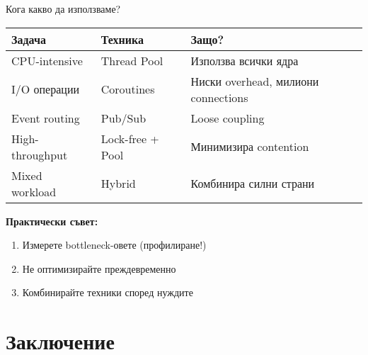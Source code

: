 \documentclass[aspectratio=169]{beamer}
\begin{document}
\begin{frame}{Кога какво да използваме?}
\begin{table}
\centering
\small
\begin{tabular}{|l|l|l|}
\hline
\textbf{Задача} & \textbf{Техника} & \textbf{Защо?} \\
\hline
CPU-intensive & Thread Pool & Използва всички ядра \\
I/O операции & Coroutines & Ниски overhead, милиони connections \\
Event routing & Pub/Sub & Loose coupling \\
High-throughput & Lock-free + Pool & Минимизира contention \\
Mixed workload & Hybrid & Комбинира силни страни \\
\hline
\end{tabular}
\end{table}

\vspace{0.5cm}

\textbf{Практически съвет:}
\begin{enumerate}
    \item Измерете bottleneck-овете (профилиране!)
    \item Не оптимизирайте преждевременно
    \item Комбинирайте техники според нуждите
\end{enumerate}
\end{frame}

\section{Заключение}
\end{document}

